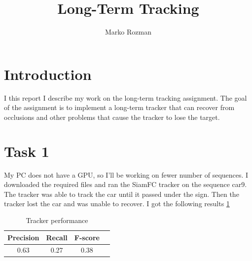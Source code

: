 \documentclass[9pt]{IEEEtran}
\title{\vspace{0ex}Long-Term Tracking}
\author{Marko Rozman\vspace{-4.0ex}}
\begin{document}
\maketitle

\section{Introduction}

I this report I describe my work on the long-term tracking assignment. The goal of the assignment is to implement a long-term tracker that can recover from occlusions and other problems that cause the tracker to lose the target. 


\section{Task 1}
My PC does not have a GPU, so I'll be working on fewer number of sequences. I downloaded the required files and ran the SiamFC tracker on the sequence car9. The tracker was able to track the car until it passed under the sign. Then the tracker lost the car and was unable to recover. I got the following results \ref{tab:results_1}

\begin{table}[H]
    \centering
    \begin{tabular}{|c|c|c|c|}
    \hline
    Precision & Recall & F-score \\
    \hline
    0.63 & 0.27 & 0.38 \\
    \hline
    \end{tabular}
    \vspace{0.5em}
    \caption{Tracker performance}
    \label{tab:results_1}
    \end{table}
\end{document}
